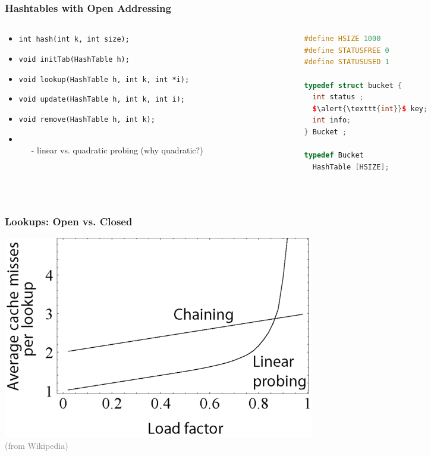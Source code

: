 \documentclass[aspectratio=169]{beamer}
\begin{document}
\begin{frame}[fragile]\frametitle{Hashtables with Open Addressing}
\begin{columns}
\begin{column}{.71\textwidth}
%
\begin{itemize}
  \item \texttt{int hash(\alert{\texttt{int}} k, int size);}
  \item \texttt{void initTab(HashTable h);}
  \item \texttt{void lookup(HashTable h, \alert{\texttt{int}} k, int *i);}
  \item \texttt{void update(HashTable h, \alert{\texttt{int}} k, int i);}
  \item \textcolor{black!40}{
          \texttt{void remove(HashTable h, \alert{\texttt{int}} k);}}
  \item {}
          \\~~~- linear vs. quadratic probing (why quadratic?)
\end{itemize}
%
\end{column}
\begin{column}{.34\textwidth}
%
\begin{lstlisting}[language=C++,emph={HashTable,Bucket}]
#define HSIZE 1000
#define STATUSFREE 0
#define STATUSUSED 1

typedef struct bucket {
  int status ;
  $\alert{\texttt{int}}$ key;
  int info;
} Bucket ;

typedef Bucket
  HashTable [HSIZE];
\end{lstlisting}
%
\end{column}
\end{columns}

~\\[-7mm]
\end{frame}



\begin{frame}\frametitle{Lookups: Open vs. Closed}
  \centering
  \includegraphics[width=0.6\textwidth]{images/HT-lookups.png}
  \\
  {\footnotesize \textcolor{gray}{(from Wikipedia)}}
\end{frame}
    
\end{document}
